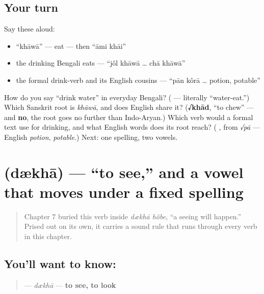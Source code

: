 \subsection*{Your turn}
Say these aloud:

\begin{itemize}
\raggedright
  \item \textquotedblleft{}khāwā\textquotedblright{} — eat — then \textquotedblleft{}āmi khāi\textquotedblright{}
  \item the drinking Bengali eats — \textquotedblleft{}jôl khāwā … chā khāwā\textquotedblright{}
  \item the formal drink-verb and its English cousins — \textquotedblleft{}pān kôrā … potion, potable\textquotedblright{}
\end{itemize}

\begin{tcolorbox}[breakable,colback=teal!4,colframe=teal!35!black,title={Before you move on}]
How do you say \textquotedblleft{}drink water\textquotedblright{} in everyday Bengali? (\textbf{ } — literally \textquotedblleft{}water-eat.\textquotedblright{}) Which Sanskrit root is \emph{khāwā}, and does English share it? (\textbf{√khād}, \textquotedblleft{}to chew\textquotedblright{} — and \textbf{no}, the root goes no further than Indo-Aryan.) Which verb would a formal text use for drinking, and what English words does its root reach? (\textbf{ }, from \emph{√pā} — English \emph{potion}, \emph{potable}.) Next: one spelling, two vowels.
\end{tcolorbox}
\section[dækhā]{ (dækhā) — \textquotedblleft{}to see,\textquotedblright{} and a vowel that moves under a fixed spelling}

\label{lesson:BN-C07-dekha}



\begin{quote}
Chapter 7 buried this verb inside \emph{dækhā hôbe}, \textquotedblleft{}a seeing will happen.\textquotedblright{} Prised out on its own, it carries a sound rule that runs through every verb in this chapter.
\end{quote}

\subsection*{You'll want to know: }
\begin{quote}
\textbf{} — \emph{dækhā} — \textbf{to see, to look}
\end{quote}

